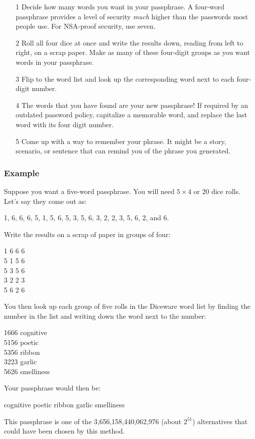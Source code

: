 \begin{itemize}[leftmargin=*]

\item[1] Decide how many words you want in your passphrase. A four-word passphrase provides a level of security \textit{much} higher than the passwords most people use. For NSA-proof security, use seven.

\item[2] Roll all four dice at once and write the results down, reading from left to right, on a scrap paper. Make as many of these four-digit groups as you want words in your passphrase.

\item[3] Flip to the word list and look up the corresponding word next to each four-digit number.

\item[4] The words that you have found are your new passphrase! If required by an outdated password policy, capitalize a memorable word, and replace the last word with its four digit number.

\item[5] Come up with a way to remember your phrase. It might be a story, scenario, or sentence that can remind you of the phrase you generated.

\end{itemize}

\subsubsection*{Example}

Suppose you want a five-word passphrase. You will need $5 \times 4$ or 20 dice rolls. Let's say they come out as:

1, 6, 6, 6, 5, 1, 5, 6, 5, 3, 5, 6, 3, 2, 2, 3, 5, 6, 2, and 6. 

Write the results on a scrap of paper in groups of four:

1 6 6 6 \\
5 1 5 6 \\
5 3 5 6 \\
3 2 2 3 \\
5 6 2 6

You then look up each group of five rolls in the Diceware word list by finding the number in the list and writing down the word next to the number:

1666 cognitive \\
5156 poetic \\
5356 ribbon \\
3223 garlic \\
5626 smelliness

Your passphrase would then be:

cognitive poetic ribbon garlic smelliness

This passphrase is one of the 3,656,158,440,062,976 (about $2^{51}$) alternatives that could have been chosen by this method. 
